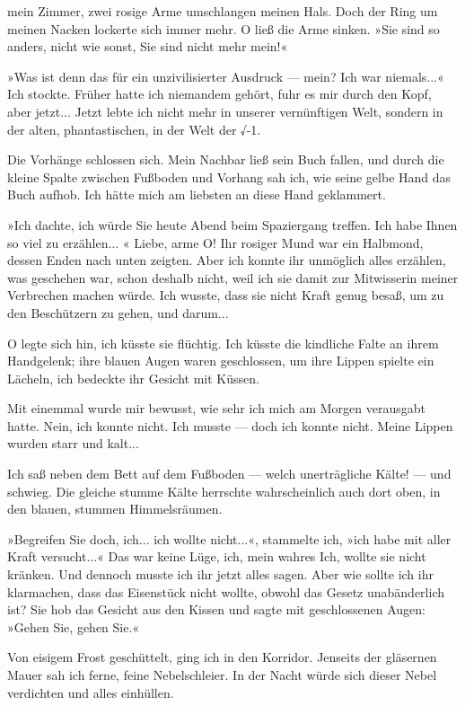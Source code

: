 mein Zimmer, zwei rosige Arme umschlangen meinen Hals. Doch der
Ring um meinen Nacken lockerte sich immer mehr. O ließ die Arme
sinken. »Sie sind so anders, nicht wie sonst, Sie sind nicht mehr
mein!«

»Was ist denn das für ein unzivilisierter Ausdruck — mein? Ich war
niemals...« Ich stockte. Früher hatte ich niemandem gehört, fuhr es
mir durch den Kopf, aber jetzt... Jetzt lebte ich nicht mehr in
unserer vernünftigen Welt, sondern in der alten, phantastischen, in
der Welt der √-1.

Die Vorhänge schlossen sich. Mein Nachbar ließ sein Buch fallen,
und durch die kleine Spalte zwischen Fußboden und Vorhang sah ich,
wie seine gelbe Hand das Buch aufhob. Ich hätte mich am liebsten an
diese Hand geklammert.

»Ich dachte, ich würde Sie heute Abend beim Spaziergang treffen.
Ich habe Ihnen so viel zu erzählen... « Liebe, arme O! Ihr rosiger
Mund war ein Halbmond, dessen Enden nach unten zeigten. Aber ich
konnte ihr unmöglich alles erzählen, was geschehen war, schon
deshalb nicht, weil ich sie damit zur Mitwisserin meiner Verbrechen
machen würde. Ich wusste, dass sie nicht Kraft genug besaß, um zu
den Beschützern zu gehen, und darum...

O legte sich hin, ich küsste sie flüchtig. Ich küsste die kindliche
Falte an ihrem Handgelenk; ihre blauen Augen waren geschlossen, um
ihre Lippen spielte ein Lächeln, ich bedeckte ihr Gesicht mit
Küssen.

Mit einemmal wurde mir bewusst, wie sehr ich mich am Morgen
verausgabt hatte. Nein, ich konnte nicht. Ich musste — doch ich
konnte nicht. Meine Lippen wurden starr und kalt...

Ich saß neben dem Bett auf dem Fußboden — welch unerträgliche
Kälte! — und schwieg. Die gleiche stumme Kälte herrschte
wahrscheinlich auch dort oben, in den blauen, stummen
Himmelsräumen.

»Begreifen Sie doch, ich... ich wollte nicht...«, stammelte ich,
»ich habe mit aller Kraft versucht...« Das war keine Lüge, ich,
mein wahres Ich, wollte sie nicht kränken. Und dennoch musste ich
ihr jetzt alles sagen. Aber wie sollte ich ihr klarmachen, dass das
Eisenstück nicht wollte, obwohl das Gesetz unabänderlich ist? Sie
hob das Gesicht aus den Kissen und sagte mit geschlossenen Augen:
»Gehen Sie, gehen Sie.«

Von eisigem Frost geschüttelt, ging ich in den Korridor. Jenseits
der gläsernen Mauer sah ich ferne, feine Nebelschleier. In der
Nacht würde sich dieser Nebel verdichten und alles einhüllen.


